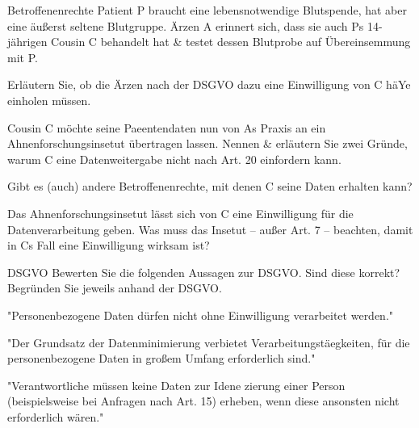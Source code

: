 \documentclass{exercisesheet}
\begin{document}
\begin{exercise*}{Betroffenenrechte}{
    Patient P braucht eine lebensnotwendige Blutspende, hat aber eine äußerst seltene Blutgruppe. Ärzen A erinnert sich, dass sie auch Ps 14-jährigen Cousin C behandelt hat \& testet dessen Blutprobe auf Übereinsemmung mit P.
  }
  \item Erläutern Sie, ob die Ärzen nach der DSGVO dazu eine Einwilligung von C häYe einholen müssen.
  \item Cousin C möchte seine Paeentendaten nun von As Praxis an ein Ahnenforschungsinsetut übertragen lassen. Nennen \& erläutern Sie zwei Gründe, warum C eine Datenweitergabe nicht nach Art. 20 einfordern kann.
  \item Gibt es (auch) andere Betroffenenrechte, mit denen C seine Daten erhalten kann?
  \item Das Ahnenforschungsinsetut lässt sich von C eine Einwilligung für die Datenverarbeitung geben. Was muss das Insetut – außer Art. 7 – beachten, damit in Cs Fall eine Einwilligung wirksam ist?
\end{exercise*}

\begin{exercise*}{DSGVO}{
    Bewerten Sie die folgenden Aussagen zur DSGVO. Sind diese korrekt? Begründen Sie jeweils anhand der DSGVO.
  }
  \item "Personenbezogene Daten dürfen nicht ohne Einwilligung verarbeitet werden."
  \item "Der Grundsatz der Datenminimierung verbietet Verarbeitungstäegkeiten, für die personenbezogene Daten in großem Umfang erforderlich sind."
  \item "Verantwortliche müssen keine Daten zur Idene zierung einer Person (beispielsweise bei Anfragen nach Art. 15) erheben, wenn diese ansonsten nicht erforderlich wären."
\end{exercise*}
\end{document}

